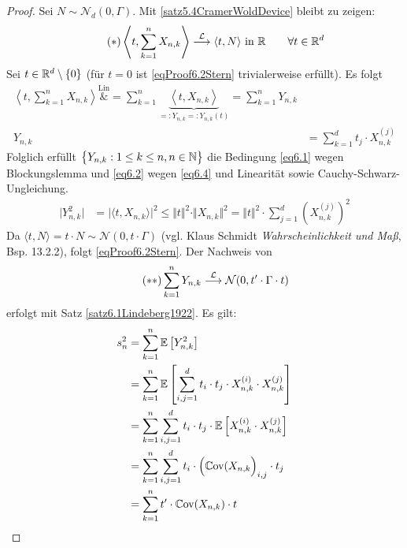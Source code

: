 \begin{proof}
Sei $N\sim\mathcal{N}_d(0,\Gamma)$. Mit \ref{satz5.4CramerWoldDevice} bleibt zu zeigen:
\begin{align}
\label{eqProof6.2Stern}\tag{$\ast$}
\left\langle t,\sum\limits_{k=1}^n X_{n,k}\right\rangle\stackrel{\mathcal{L}}{\longrightarrow}\langle t,N\rangle\text{ in }\mathbb{R}\qquad\forall t\in\mathbb{R}^d
\end{align}
Sei $t\in\mathbb{R}^d\setminus\lbrace0\rbrace$ (für $t=0$ ist \eqref{eqProof6.2Stern} trivialerweise erfüllt). Es folgt
\begin{align*}
\left\langle t,\sum\limits_{k=1}^n X_{n,k}\right\rangle
\overset{\text{Lin}}&=
\sum\limits_{k=1}^n\underbrace{\left\langle t,X_{n,k}\right\rangle}_{=:Y_{n,k}=:Y_{n,k}(t)}
=\sum\limits_{k=1}^n Y_{n,k}\\
Y_{n,k}
&=\sum\limits_{k=1}^d t_j\cdot X_{n,k}^{(j)}
\end{align*}
Folglich erfüllt $\big\lbrace Y_{n,k}:1\leq k\leq n,n\in\mathbb{N}\big\rbrace$ die Bedingung \eqref{eq6.1} wegen Blockungslemma und \eqref{eq6.2} wegen \eqref{eq6.4} und Linearität sowie Cauchy-Schwarz-Ungleichung.
\begin{align*}
\big|Y_{n,k}^2\big|&=\big|\langle t,X_{n,k}\rangle\big|^2
\leq\Vert t\Vert^2\cdot\Vert X_{n,k}\Vert^2
=\Vert t\Vert^2\cdot\sum\limits_{j=1}^d\left(X_{n,k}^{(j)}\right)^2
\end{align*}
Da $\langle t,N\rangle=t\cdot N\sim\mathcal{N}(0,t\cdot\Gamma)$ (vgl. Klaus Schmidt \textit{Wahrscheinlichkeit und Maß}, Bsp. 13.2.2), folgt \eqref{eqProof6.2Stern}. Der Nachweis von 
\begin{align}\label{eqProof6.2SternStern}\tag{$\ast\ast$}
\sum\limits_{k=1}^n Y_{n,k}\stackrel{\mathcal{L}}{\longrightarrow}\mathcal{N}(0,t'\cdot\Gamma\cdot t)
\end{align}
erfolgt mit Satz \ref{satz6.1Lindeberg1922}. Es gilt:
\begin{align*}
s_n^2
&=\sum\limits_{k=1}^n\E\left[Y_{n,k}^2\right]\\
&=\sum\limits_{k=1}^n\E\left[\sum\limits_{i,j=1}^d t_i\cdot t_j\cdot X_{n,k}^{(i)}\cdot X_{n,k}^{(j)}\right]\\
&=\sum\limits_{k=1}^n\sum\limits_{i,j=1}^d t_i\cdot t_j\cdot\E\left[X_{n,k}^{(i)}\cdot X_{n,k}^{(j)}\right]\\
&=\sum\limits_{k=1}^n\sum\limits_{i,j=1}^d t_i\cdot\Big(\Cov(X_{n,k}\Big)_{i,j}\cdot t_j\\
&=\sum\limits_{k=1}^n t'\cdot\Cov(X_{n,k})\cdot t\\

\end{align*}
\end{proof}
